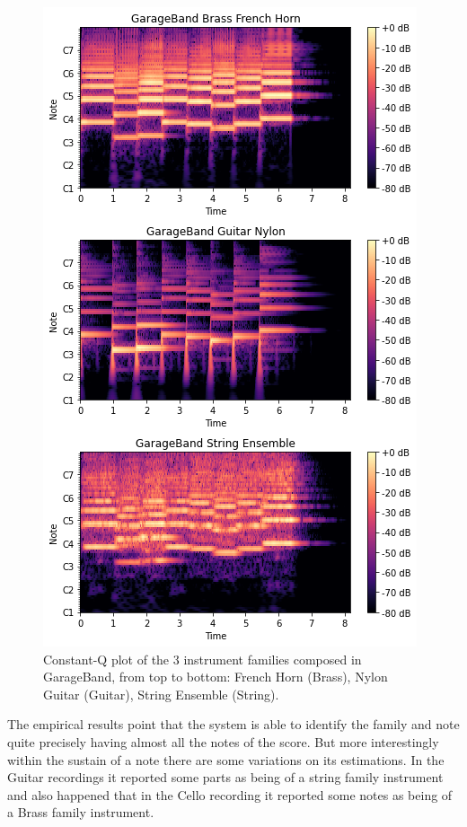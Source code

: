 \documentclass{article}
\begin{document}
\begin{figure}[h!]
	\begin{center}
		\includegraphics[scale=0.59]{download2}
		\caption{Constant-Q plot of the 3 instrument families composed in GarageBand, from top to bottom: French Horn (Brass), Nylon Guitar (Guitar), String Ensemble (String).}
		\label{ConstantQCompositions2}
	\end{center}
\end{figure}
The empirical results point that the system is able to identify the family and note quite precisely having almost all the notes of the score. But more interestingly within the sustain of a note there are some variations on its estimations. In the Guitar recordings it reported some parts as being of a string family instrument and also happened that in the Cello recording it reported some notes as being of a Brass family instrument. 
\end{document}
